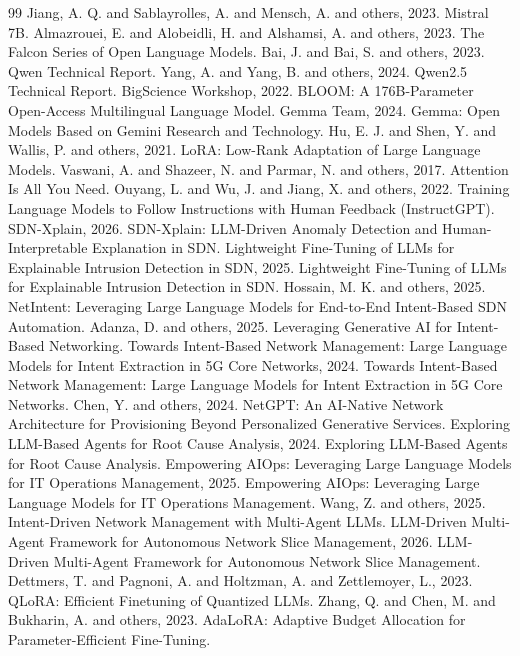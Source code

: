 \documentclass[12pt,a4paper]{article}
\begin{document}
\begin{thebibliography}{99}
 Jiang, A. Q. and Sablayrolles, A. and Mensch, A. and others, 2023. Mistral 7B.
 Almazrouei, E. and Alobeidli, H. and Alshamsi, A. and others, 2023. The Falcon Series of Open Language Models.
 Bai, J. and Bai, S. and others, 2023. Qwen Technical Report.
 Yang, A. and Yang, B. and others, 2024. Qwen2.5 Technical Report.
 BigScience Workshop, 2022. BLOOM: A 176B-Parameter Open-Access Multilingual Language Model.
 Gemma Team, 2024. Gemma: Open Models Based on Gemini Research and Technology.
 Hu, E. J. and Shen, Y. and Wallis, P. and others, 2021. LoRA: Low-Rank Adaptation of Large Language Models.
 Vaswani, A. and Shazeer, N. and Parmar, N. and others, 2017. Attention Is All You Need.
 Ouyang, L. and Wu, J. and Jiang, X. and others, 2022. Training Language Models to Follow Instructions with Human Feedback (InstructGPT).
 SDN-Xplain, 2026. SDN-Xplain: LLM-Driven Anomaly Detection and Human-Interpretable Explanation in SDN.
 Lightweight Fine-Tuning of LLMs for Explainable Intrusion Detection in SDN, 2025. Lightweight Fine-Tuning of LLMs for Explainable Intrusion Detection in SDN.
 Hossain, M. K. and others, 2025. NetIntent: Leveraging Large Language Models for End-to-End Intent-Based SDN Automation.
 Adanza, D. and others, 2025. Leveraging Generative AI for Intent-Based Networking.
 Towards Intent-Based Network Management: Large Language Models for Intent Extraction in 5G Core Networks, 2024. Towards Intent-Based Network Management: Large Language Models for Intent Extraction in 5G Core Networks.
 Chen, Y. and others, 2024. NetGPT: An AI-Native Network Architecture for Provisioning Beyond Personalized Generative Services.
 Exploring LLM-Based Agents for Root Cause Analysis, 2024. Exploring LLM-Based Agents for Root Cause Analysis.
 Empowering AIOps: Leveraging Large Language Models for IT Operations Management, 2025. Empowering AIOps: Leveraging Large Language Models for IT Operations Management.
 Wang, Z. and others, 2025. Intent-Driven Network Management with Multi-Agent LLMs.
 LLM-Driven Multi-Agent Framework for Autonomous Network Slice Management, 2026. LLM-Driven Multi-Agent Framework for Autonomous Network Slice Management.
 Dettmers, T. and Pagnoni, A. and Holtzman, A. and Zettlemoyer, L., 2023. QLoRA: Efficient Finetuning of Quantized LLMs.
 Zhang, Q. and Chen, M. and Bukharin, A. and others, 2023. AdaLoRA: Adaptive Budget Allocation for Parameter-Efficient Fine-Tuning.

\end{thebibliography}
\end{document}
